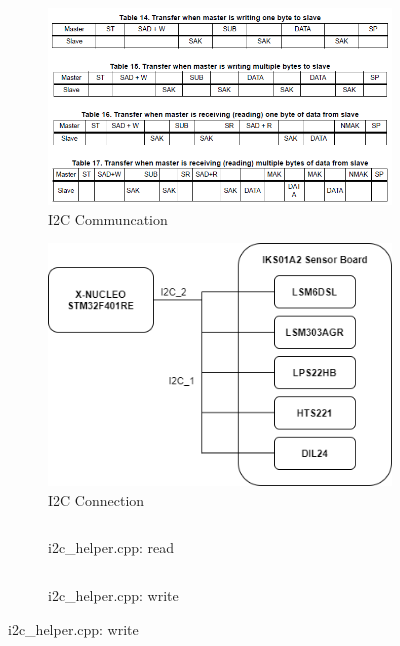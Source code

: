 \begin{center}
	\begin{figure}[H]
		\begin{subfigure}[H]{0.45\textwidth}
			\hfill\includegraphics[scale=0.6]{figures/lsm6dsl_datasheet.png}\hspace*{\fill}
			\caption{I2C Communcation}\label{fig:4a}
		\end{subfigure}
		\hfill
		\begin{subfigure}[H]{0.45\textwidth}
			\hfill\includegraphics[scale=0.5]{figures/i2c_com.png}\hspace*{\fill}
			\caption{I2C Connection}\label{fig:4b}
		\end{subfigure}
			\begin{subfigure}[H]{0.5\textwidth}
			\inputminted[framesep=1.5cm, firstline=46, lastline=67, bgcolor=whitesmoke, fontsize=\tiny]{C++}{code/i2c_helper.cpp}
			\vspace{-20pt}
			\caption{i2c\_helper.cpp: read}\label{fig:4c}
			\end{subfigure}
		\hfill
		\begin{subfigure}[H]{0.45\textwidth}
			\vspace{+1pt}
			\inputminted[framesep=1.5cm, firstline=90, lastline=112, bgcolor=whitesmoke, fontsize=\tiny]{C++}{code/i2c_helper.cpp}
			\vspace{-20pt}
			\caption{i2c\_helper.cpp: write}\label{fig:4d}
		\end{subfigure}
	\end{figure}
\end{center}

